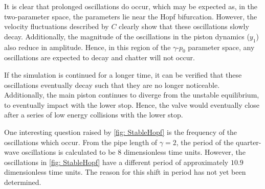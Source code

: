 It is clear that prolonged oscillations do occur, which may be expected as, in the two-parameter space, the parameters lie near the Hopf bifurcation. However, the velocity fluctuations described by $C$ clearly show that these oscillations slowly decay. Additionally, the magnitude of the oscillations in the piston dynamics ($y_1$) also reduce in amplitude. Hence, in this region of the $\gamma$-$p_0$ parameter space, any oscillations are expected to decay and chatter will not occur.

If the simulation is continued for a longer time, it can be verified that these oscillations eventually decay such that they are no longer noticeable. Additionally, the main piston continues to diverge from the unstable equilibrium, to eventually impact with the lower stop. Hence,
the valve would eventually close after a series of low energy collisions with the lower stop.

One interesting question raised by \cref{fig: StableHopf} is the frequency of the oscillations which occur. From the pipe length of $\gamma = 2$, the period of the quarter-wave oscillations is calculated to be $8$ dimensionless time units. However, the oscillations in \cref{fig: StableHopf} have a different period of approximately $10.9$ dimensionless time units. The reason for this shift in period has not yet been determined.
%

